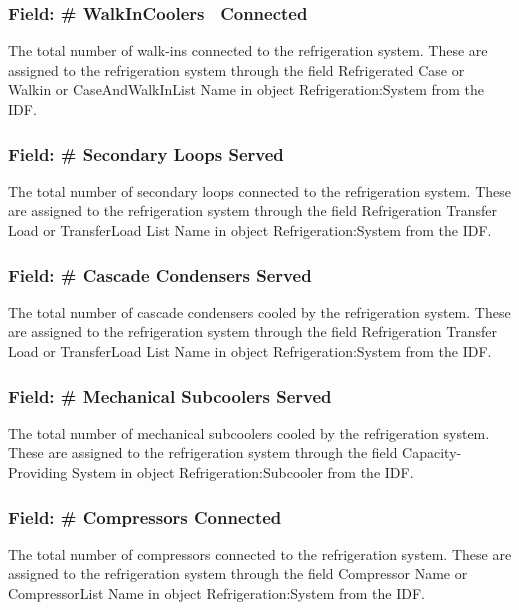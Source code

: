 \subsubsection{Field: \# WalkInCoolers~ Connected}\label{field-walkincoolers-connected-1}

The total number of walk-ins connected to the refrigeration system. These are assigned to the refrigeration system through the field Refrigerated Case or Walkin or CaseAndWalkInList Name in object Refrigeration:System from the IDF.

\subsubsection{Field: \# Secondary Loops Served}\label{field-secondary-loops-served}

The total number of secondary loops connected to the refrigeration system. These are assigned to the refrigeration system through the field Refrigeration Transfer Load or TransferLoad List Name in object Refrigeration:System from the IDF.

\subsubsection{Field: \# Cascade Condensers Served}\label{field-cascade-condensers-served}

The total number of cascade condensers cooled by the refrigeration system. These are assigned to the refrigeration system through the field Refrigeration Transfer Load or TransferLoad List Name in object Refrigeration:System from the IDF.

\subsubsection{Field: \# Mechanical Subcoolers Served}\label{field-mechanical-subcoolers-served}

The total number of mechanical subcoolers cooled by the refrigeration system. These are assigned to the refrigeration system through the field Capacity-Providing System in object Refrigeration:Subcooler from the IDF.

\subsubsection{Field: \# Compressors Connected}\label{field-compressors-connected}

The total number of compressors connected to the refrigeration system. These are assigned to the refrigeration system through the field Compressor Name or CompressorList Name in object Refrigeration:System from the IDF.

